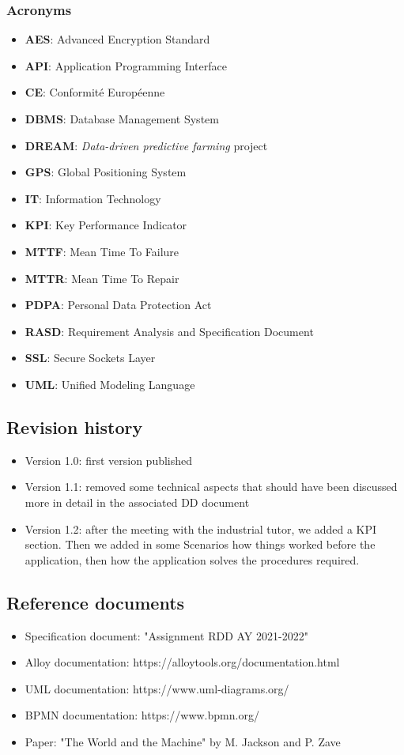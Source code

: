 \documentclass[table, 12pt]{article}
\begin{document}
\subsubsection*{Acronyms}
\begin{itemize}
    \item \textbf{AES}: Advanced Encryption Standard
    \item \textbf{API}: Application Programming Interface
    \item \textbf{CE}: Conformité Européenne
    \item \textbf{DBMS}: Database Management System
    \item \textbf{DREAM}: \emph{Data-driven predictive farming} project
    \item \textbf{GPS}: Global Positioning System
    \item \textbf{IT}: Information Technology
    \item \textbf{KPI}: Key Performance Indicator
    \item \textbf{MTTF}: Mean Time To Failure
    \item \textbf{MTTR}: Mean Time To Repair
    \item \textbf{PDPA}: Personal Data Protection Act 
    \item \textbf{RASD}: Requirement Analysis and Specification Document
    \item \textbf{SSL}: Secure Sockets Layer
    \item \textbf{UML}: Unified Modeling Language
\end{itemize}
\subsection{Revision history}
\begin{itemize}
    \item Version 1.0: first version published
    \item Version 1.1: removed some technical aspects that should have been discussed more in detail in the associated DD document
    \item Version 1.2: after the meeting with the industrial tutor, we added a KPI section. Then we added in some Scenarios how things worked before the application, then how the application solves the procedures required.
\end{itemize}
\subsection{Reference documents}
\begin{itemize}
    \item Specification document: "Assignment RDD AY 2021-2022"
    \item Alloy documentation: https://alloytools.org/documentation.html
    \item UML documentation: https://www.uml-diagrams.org/
    \item BPMN documentation: https://www.bpmn.org/
    \item Paper: "The World and the Machine" by M. Jackson and P. Zave   
\end{itemize}
\end{document}
